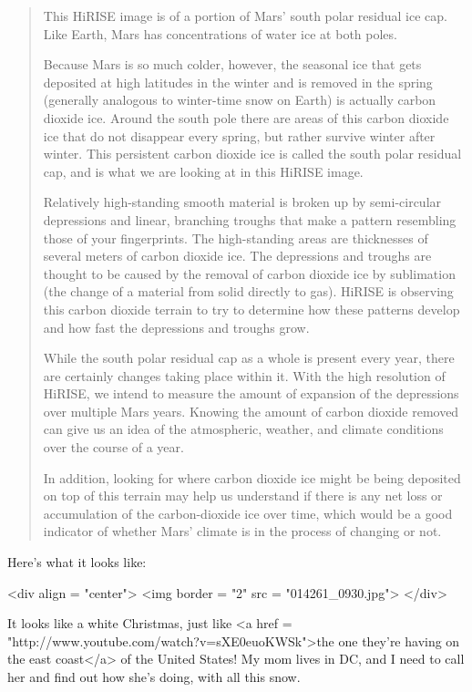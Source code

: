 \begin{quote}

   This HiRISE image is of a portion of Mars' south polar residual ice
   cap. Like Earth, Mars has concentrations of water ice at both poles.

   Because Mars is so much colder, however, the seasonal ice that gets
   deposited at high latitudes in the winter and is removed in the
   spring (generally analogous to winter-time snow on Earth) is
   actually carbon dioxide ice. Around the south pole there are areas
   of this carbon dioxide ice that do not disappear every spring, but
   rather survive winter after winter. This persistent carbon dioxide
   ice is called the south polar residual cap, and is what we are
   looking at in this HiRISE image.

   Relatively high-standing smooth material is broken up by
   semi-circular depressions and linear, branching troughs that make a
   pattern resembling those of your fingerprints. The high-standing
   areas are thicknesses of several meters of carbon dioxide ice. The
   depressions and troughs are thought to be caused by the removal of
   carbon dioxide ice by sublimation (the change of a material from
   solid directly to gas). HiRISE is observing this carbon dioxide
   terrain to try to determine how these patterns develop and how fast
   the depressions and troughs grow.

   While the south polar residual cap as a whole is present every
   year, there are certainly changes taking place within it. With the
   high resolution of HiRISE, we intend to measure the amount of
   expansion of the depressions over multiple Mars years. Knowing the
   amount of carbon dioxide removed can give us an idea of the
   atmospheric, weather, and climate conditions over the course of a
   year.

   In addition, looking for where carbon dioxide ice might be being
   deposited on top of this terrain may help us understand if there is
   any net loss or accumulation of the carbon-dioxide ice over time,
   which would be a good indicator of whether Mars' climate is in the
   process of changing or not.

\end{quote}

Here's what it looks like:

<div align = "center">
<img border = "2" src = "014261_0930.jpg">
</div>

It looks like a white Christmas, just like <a href = 
"http://www.youtube.com/watch?v=sXE0euoKWSk">the one they're having
on the east coast</a> of the United States!  My mom lives in DC,
and I need to call her and find out how she's doing, with all this
snow.

